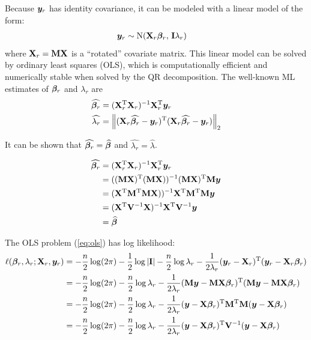 Because $\bm{y}_r$ has identity covariance, it can be modeled with a linear model of the form:
\begin{align}
    \bm{y}_r &\sim \mathrm{N}(\mathbf{X}_r \boldsymbol{\beta}_r, \, \mathbf{I} \lambda_r) \label{eq:ols}
\end{align}
where $\mathbf{X}_r = \mathbf{M} \mathbf{X}$ is a ``rotated'' covariate matrix.
This linear model can be solved by ordinary least squares (OLS), which is computationally efficient and numerically stable when solved by the QR decomposition.
The well-known ML estimates of $\boldsymbol{\beta}_r$ and $\lambda_r$ are
\begin{align}
    \widehat{\boldsymbol{\beta}_r}    &= (\mathbf{X}_r ^\mathrm{T} \mathbf{X}_r) ^{-1} \mathbf{X}_r ^\mathrm{T} \bm{y}_r\\
    \widehat{\lambda_r}   &= \left\lVert(\mathbf{X}_r \widehat{\boldsymbol{\beta}_r} - \bm{y}_r)^\mathrm{T}(\mathbf{X}_r \widehat{\boldsymbol{\beta}_r} - \bm{y}_r)\right\rVert_{2}
\end{align}

It can be shown that $\widehat{\boldsymbol{\beta}_r} = \widehat{\boldsymbol{\beta}}$ and $\widehat{\lambda_r} = \widehat{\lambda}$.

\begin{align}
  \widehat{\boldsymbol{\beta}_r}    &= (\mathbf{X}_r ^\mathrm{T} \mathbf{X}_r) ^{-1} \mathbf{X}_r ^\mathrm{T} \bm{y}_r\\
                        &= ((\mathbf{M} \mathbf{X})^\mathrm{T} (\mathbf{M} \mathbf{X})) ^{-1} (\mathbf{M} \mathbf{X})^\mathrm{T} \mathbf{M} \bm{y}\\
                        &= (\mathbf{X}^\mathrm{T} \mathbf{M}^\mathrm{T} \mathbf{M} \mathbf{X}))^{-1} \mathbf{X}^\mathrm{T} \mathbf{M}^\mathrm{T} \mathbf{M} \bm{y}\\
                        &= (\mathbf{X}^\mathrm{T} \mathbf{V}^{-1} \mathbf{X})^{-1} \mathbf{X}^\mathrm{T} \mathbf{V}^{-1} \bm{y}\\
                        &= \widehat{\boldsymbol{\beta}}
\end{align}

The OLS problem (\cref{eq:ols}) has log likelihood:
\begin{align}
    \ell(\boldsymbol{\beta}_r, \lambda_r; \mathbf{X}_r, \bm{y}_r) 
    &=    -\frac{n}{2}\log(2\pi)
          -\frac{1}{2}\log|\mathbf{I}|
          -\frac{n}{2}\log\lambda_r
          -\frac{1}{2\lambda_r}
          (\bm{y}_r - \mathbf{X}_r)^\mathrm{T} (\bm{y}_r - \mathbf{X}_r\boldsymbol{\beta}_r)\\
    & =
          -\frac{n}{2}\log(2\pi)
          -\frac{n}{2}\log\lambda_r
          -\frac{1}{2\lambda_r}
          (\mathbf{M}\bm{y} - \mathbf{M}\mathbf{X}\boldsymbol{\beta}_r)^\mathrm{T} (\mathbf{M}\bm{y} - \mathbf{M}\mathbf{X}\boldsymbol{\beta}_r)\\
    &=    -\frac{n}{2}\log(2\pi)
          -\frac{n}{2}\log\lambda_r
          -\frac{1}{2\lambda_r}
          (\bm{y} - \mathbf{X}\boldsymbol{\beta}_r)^\mathrm{T} \mathbf{M}^\mathrm{T} \mathbf{M} (\bm{y} - \mathbf{X}\boldsymbol{\beta}_r)\\
    &=    -\frac{n}{2}\log(2\pi)
          -\frac{n}{2}\log\lambda_r
          -\frac{1}{2\lambda_r}
          (\bm{y}-\mathbf{X}\boldsymbol{\beta}_r)^\mathrm{T} \mathbf{V}^{-1} (\bm{y}-\mathbf{X}\boldsymbol{\beta}_r)
\end{align}

